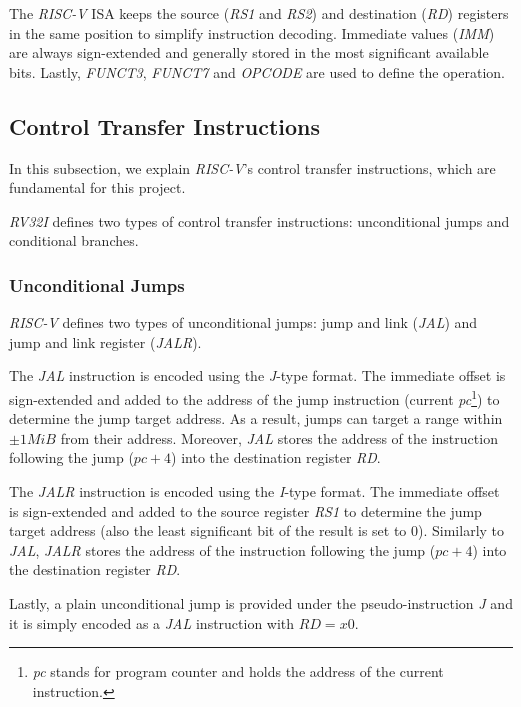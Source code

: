 The \textit{RISC-V} ISA keeps the source (\textit{RS1} and \textit{RS2}) and destination
(\textit{RD}) registers in the same position to simplify instruction decoding. Immediate
values (\textit{IMM}) are always sign-extended and generally stored in the most
significant available bits. Lastly, \textit{FUNCT3}, \textit{FUNCT7} and \textit{OPCODE}
are used to define the operation.

\subsection{Control Transfer Instructions}
\label{subsec:riscv_controltransfer}

In this subsection, we explain \textit{RISC-V}'s control transfer instructions,
which are fundamental for this project.

\textit{RV32I} defines two types of control transfer instructions: unconditional
jumps and conditional branches.

\subsubsection{Unconditional Jumps}
\label{subsubsec:riscv_unconditionalj}

\textit{RISC-V} defines two types of unconditional jumps: jump and link (\textit{JAL})
and jump and link register (\textit{JALR}).

The \textit{JAL} instruction is encoded using the \textit{J}-type format. The
immediate offset is sign-extended and added to the address of the jump
instruction (current \textit{pc}\footnote{\textit{pc} stands for program counter
and holds the address of the current instruction.}) to determine the jump target
address. As a result, jumps can target a range within $\pm 1 MiB$ from their
address. Moreover, \textit{JAL} stores the address of the instruction following the
jump ($\textit{pc}+ 4$) into the destination register \textit{RD}.

The \textit{JALR} instruction is encoded using the \textit{I}-type format. The immediate
offset is sign-extended and added to the source register \textit{RS1} to
determine the jump target address (also the least significant bit of the result is
set to $0$). Similarly to \textit{JAL}, \textit{JALR} stores the address of the
instruction following the jump ($\textit{pc}+ 4$) into the destination register
\textit{RD}.

Lastly, a plain unconditional jump is provided under the pseudo-instruction
\textit{J} and it is simply encoded as a \textit{JAL} instruction with
$\textit{RD}= x0$.

